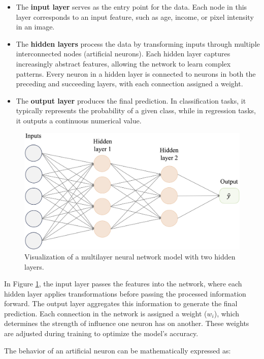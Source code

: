 \documentclass[
  11pt,
]{book}
\theoremstyle{definition}
\theoremstyle{definition}
\theoremstyle{definition}
\theoremstyle{definition}
\theoremstyle{remark}
\begin{document}
\begin{itemize}
\item
  The \textbf{input layer} serves as the entry point for the data. Each node in this layer corresponds to an input feature, such as age, income, or pixel intensity in an image.
\item
  The \textbf{hidden layers} process the data by transforming inputs through multiple interconnected nodes (artificial neurons). Each hidden layer captures increasingly abstract features, allowing the network to learn complex patterns. Every neuron in a hidden layer is connected to neurons in both the preceding and succeeding layers, with each connection assigned a weight.
\item
  The \textbf{output layer} produces the final prediction. In classification tasks, it typically represents the probability of a given class, while in regression tasks, it outputs a continuous numerical value.
\end{itemize}

\begin{figure}[H]

{\centering \includegraphics[width=0.8\linewidth]{images/ch12_net_large} 

}

\caption{Visualization of a multilayer neural network model with two hidden layers.}\label{fig:net-large}
\end{figure}

In Figure \ref{fig:net-large}, the input layer passes the features into the network, where each hidden layer applies transformations before passing the processed information forward. The output layer aggregates this information to generate the final prediction. Each connection in the network is assigned a weight (\(w_i\)), which determines the strength of influence one neuron has on another. These weights are adjusted during training to optimize the model's accuracy.

The behavior of an artificial neuron can be mathematically expressed as:
\end{document}
